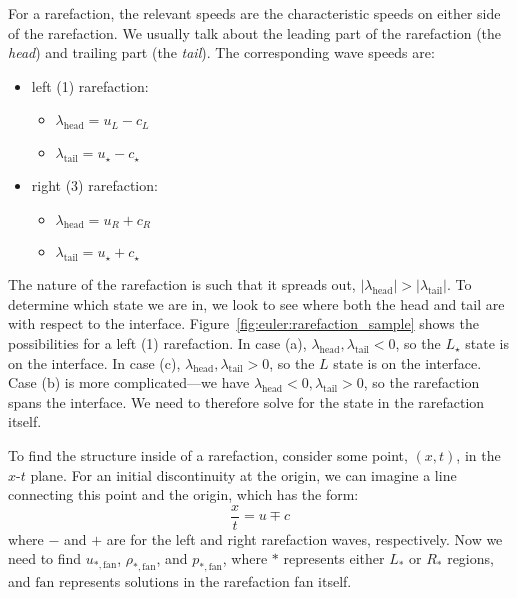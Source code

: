 For a rarefaction, the
relevant speeds are the characteristic speeds on either side of the
rarefaction.  We usually talk about the leading part of the
rarefaction (the {\em head}) and trailing part (the {\em tail}).  The
corresponding wave speeds are:
\begin{itemize}
\item left (1) rarefaction:
  \begin{itemize}
  \item $\lambda_\mathrm{head} = u_L - c_L$
  \item $\lambda_\mathrm{tail} = u_\star - c_\star$
  \end{itemize}

\item right (3) rarefaction:
  \begin{itemize}
  \item $\lambda_\mathrm{head} = u_R + c_R$
  \item $\lambda_\mathrm{tail} = u_\star + c_\star$
  \end{itemize}
\end{itemize}
The nature of the rarefaction is such that it spreads out,
$|\lambda_\mathrm{head}| > |\lambda_\mathrm{tail}|$.  To determine
which state we are in, we look to see where both the head and tail are
with respect to the interface.
Figure~\ref{fig:euler:rarefaction_sample} shows the possibilities for
a left (1) rarefaction.  In case (a), $\lambda_\mathrm{head},
\lambda_\mathrm{tail} < 0$, so the $L_\star$ state is on the
interface.  In case (c), $\lambda_\mathrm{head}, \lambda_\mathrm{tail}
> 0$, so the $L$ state is on the interface.  Case (b) is more
complicated---we have $\lambda_\mathrm{head} <0, \lambda_\mathrm{tail}
> 0$, so the rarefaction spans the interface.  We need to therefore
solve for the state in the rarefaction itself.

To find the structure inside of a rarefaction, consider some point,
$(x, t)$, in the $x$-$t$ plane.  For an initial discontinuity at the
origin, we can imagine a line connecting this point and the origin,
which has the form:
\begin{equation}
\frac{x}{t} = u \mp c
\end{equation}
where $-$ and $+$ are for the left and right rarefaction waves, respectively.
Now we need to find $u_{*,\mathrm{fan}}$, $\rho_{*,\mathrm{fan}}$, and $p_{*,\mathrm{fan}}$,
where $*$ represents either $L_*$ or $R_*$ regions, and $\mathrm{fan}$ represents
solutions in the rarefaction fan itself.

